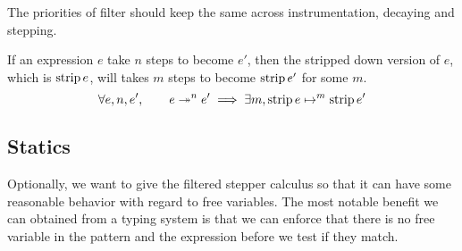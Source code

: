 




\begin{conjecture}
  The priorities of filter should keep the same across instrumentation, decaying and stepping.
\end{conjecture}




\begin{theorem}[Simulation]
  If an expression \(e\) take \(n\) steps to become \(e'\), then the stripped down version of \(e\), which is \(\Strip{e}\), will takes \(m\) steps to become \(\Strip{e'}\) for some \(m\).
  \[
    \forall e, n, e', \qquad
    \Step{e}{e'}{n} \implies \exists m, \JustStep{\Strip{e}}{\Strip{e'}}{m}
  \]
\end{theorem}

\subsection{Statics}

Optionally, we want to give the filtered stepper calculus so that it can have some reasonable behavior with regard to free variables. The most notable benefit we can obtained from a typing system is that we can enforce that there is no free variable in the pattern and the expression before we test if they match.

